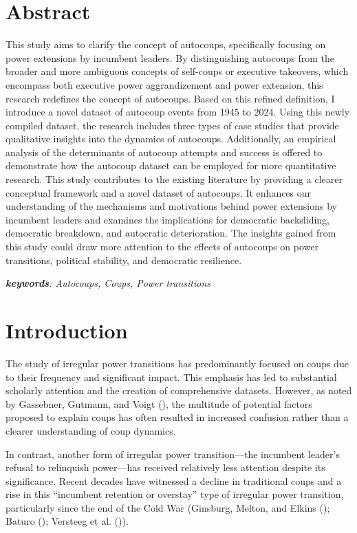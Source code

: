 \documentclass[
  12pt,
]{report}
\begin{document}
\section*{Abstract}\label{abstract-2}

This study aims to clarify the concept of autocoups, specifically
focusing on power extensions by incumbent leaders. By distinguishing
autocoups from the broader and more ambiguous concepts of self-coups or
executive takeovers, which encompass both executive power aggrandizement
and power extension, this research redefines the concept of autocoups.
Based on this refined definition, I introduce a novel dataset of
autocoup events from 1945 to 2024. Using this newly compiled dataset,
the research includes three types of case studies that provide
qualitative insights into the dynamics of autocoups. Additionally, an
empirical analysis of the determinants of autocoup attempts and success
is offered to demonstrate how the autocoup dataset can be employed for
more quantitative research. This study contributes to the existing
literature by providing a clearer conceptual framework and a novel
dataset of autocoups. It enhances our understanding of the mechanisms
and motivations behind power extensions by incumbent leaders and
examines the implications for democratic backsliding, democratic
breakdown, and autocratic deterioration. The insights gained from this
study could draw more attention to the effects of autocoups on power
transitions, political stability, and democratic resilience.

\emph{\textbf{keywords}: Autocoups, Coups, Power transitions}

\newpage

\section{Introduction}\label{introduction-2}

The study of irregular power transitions has predominantly focused on
coups due to their frequency and significant impact. This emphasis has
led to substantial scholarly attention and the creation of comprehensive
datasets. However, as noted by Gassebner, Gutmann, and Voigt
(), the multitude of potential factors
proposed to explain coups has often resulted in increased confusion
rather than a clearer understanding of coup dynamics.

In contrast, another form of irregular power transition---the incumbent
leader's refusal to relinquish power---has received relatively less
attention despite its significance. Recent decades have witnessed a
decline in traditional coups and a rise in this ``incumbent retention or
overstay'' type of irregular power transition, particularly since the
end of the Cold War (Ginsburg, Melton, and Elkins
(); Baturo
(); Versteeg et al.
()).
\end{document}
